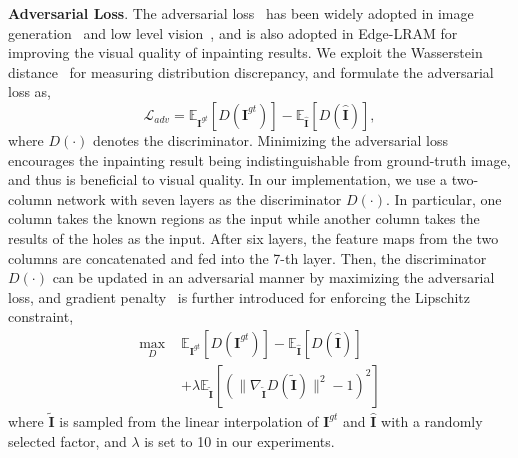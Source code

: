 \documentclass[10pt,journal,compsoc]{IEEEtran}
\begin{document}
{\textbf{Adversarial Loss}.} The adversarial loss~\cite{Goodfellow_GAN} has been widely adopted in image generation~\cite{salimans2016improved,pixelCNN,han2017stackgan} and low level vision~\cite{Ledig2016a}, and is also adopted in Edge-LRAM for improving the visual quality of inpainting results.
%
We exploit the Wasserstein distance~\cite{MartinWGAN} for measuring distribution discrepancy, and formulate the adversarial loss as,
%
\begin{equation}
\label{adv-loss}
\mathcal{L}_{adv} =  \mathbb{E}_{\mathbf{I}^{gt} } \left[ D(\mathbf{I}^{gt}) \right]
 - \mathbb{E}_{\hat{\mathbf{I}} } \left[ D(\hat{\mathbf{I}}) \right],
\end{equation}
%
where $D(\cdot)$ denotes the discriminator.
%
Minimizing the adversarial loss encourages the inpainting result being indistinguishable from ground-truth image, and thus is beneficial to visual quality.
%
In our implementation, we use a two-column network with seven layers as the discriminator $D(\cdot)$.
%
In particular, one column takes the known regions as the input while another column takes the results of the holes as the input.
%
After six layers, the feature maps from the two columns are concatenated and fed into the 7-th layer.
%
Then, the discriminator $D(\cdot)$ can be updated in an adversarial manner by maximizing the adversarial loss, and gradient penalty~\cite{ishaan2017improved} is further introduced for enforcing the Lipschitz constraint,
%
\begin{equation}\label{adv-loss2}
\begin{split}
\max_{D}\,\, & \mathbb{E}_{\mathbf{I}^{gt} } \left[ D(\mathbf{I}^{gt}) \right]
 - \mathbb{E}_{\hat{\mathbf{I}} } \left[ D(\hat{\mathbf{I}}) \right]\\
& + \lambda \mathbb{E}_{\tilde{\mathbf{I}} }\left[(\parallel \nabla_{\tilde{\mathbf{I}}}D(\tilde{\mathbf{I}}) \parallel^2 - 1)^2 \right]
\end{split}
\end{equation}
%
where $\tilde{\mathbf{I}}$ is sampled from the linear interpolation of $\mathbf{I}^{gt}$ and $\hat{\mathbf{I}}$ with a randomly selected factor, and $\lambda$ is set to 10 in our experiments.
\end{document}
